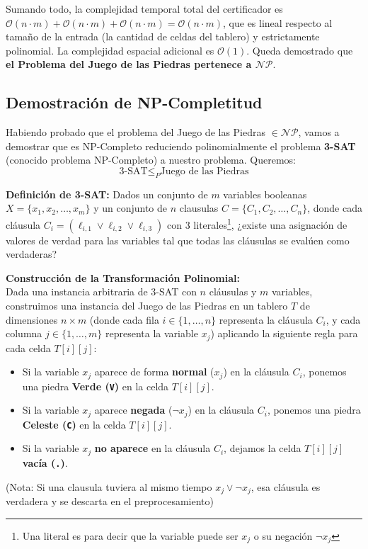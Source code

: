 Sumando todo, la complejidad temporal total del certificador es $\mathcal{O}(n \cdot m) + \mathcal{O}(n \cdot m) + \mathcal{O}(n \cdot m) = \mathcal{O}(n \cdot m)$, que es lineal respecto al tamaño de la entrada (la cantidad de celdas del tablero) y estrictamente polinomial. La complejidad espacial adicional es $\mathcal{O}(1)$. Queda demostrado que \textbf{el Problema del Juego de las Piedras pertenece a $\mathcal{NP}$}.

\subsection{Demostración de NP-Completitud}

Habiendo probado que el problema del Juego de las Piedras $\in \mathcal{NP}$, vamos a demostrar que es NP-Completo reduciendo polinomialmente el problema \textbf{3-SAT} (conocido problema NP-Completo) a nuestro problema. Queremos:
\[ \text{3-SAT} \leq_P \text{Juego de las Piedras} \]

\noindent\textbf{Definición de 3-SAT:} Dados un conjunto de $m$ variables booleanas $X = \{x_1, x_2, \dots, x_m\}$ y un conjunto de $n$ clausulas $C = \{C_1, C_2, \dots, C_n\}$, donde cada cláusula $C_i = (\ell_{i,1} \lor \ell_{i,2} \lor \ell_{i,3})$ con 3 literales\footnote{Una literal es para decir que la variable puede ser $x_j$ o su negación $\neg x_j$}, ¿existe una asignación de valores de verdad para las variables tal que todas las cláusulas se evalúen como verdaderas?

\noindent\textbf{Construcción de la Transformación Polinomial:} \\
Dada una instancia arbitraria de 3-SAT con $n$ cláusulas y $m$ variables, construimos una instancia del Juego de las Piedras en un tablero $T$ de dimensiones $n \times m$ (donde cada fila $i \in \{1, \dots, n\}$ representa la cláusula $C_i$, y cada columna $j \in \{1, \dots, m\}$ representa la variable $x_j$) aplicando la siguiente regla para cada celda $T[i][j]$:
\begin{itemize}
    \item Si la variable $x_j$ aparece de forma \textbf{normal} ($x_j$) en la cláusula $C_i$, ponemos una piedra \textbf{Verde (\texttt{V})} en la celda $T[i][j]$.
    \item Si la variable $x_j$ aparece \textbf{negada} ($\neg x_j$) en la cláusula $C_i$, ponemos una piedra \textbf{Celeste (\texttt{C})} en la celda $T[i][j]$.
    \item Si la variable $x_j$ \textbf{no aparece} en la cláusula $C_i$, dejamos la celda $T[i][j]$ \textbf{vacía (\texttt{.})}.
\end{itemize}
(Nota: Si una clausula tuviera al mismo tiempo $x_j \lor \neg x_j$, esa cláusula es verdadera y se descarta en el preprocesamiento)

